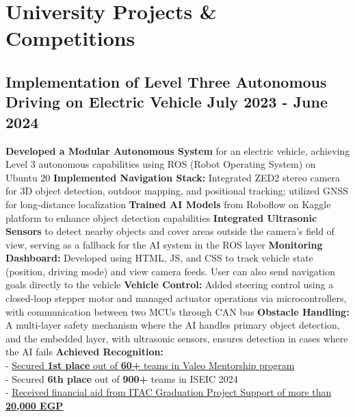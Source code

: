 \section*{University Projects \& Competitions}
%
%
%
\subsection*{
  Implementation of Level Three Autonomous Driving on Electric Vehicle
  \hspace*{\fill}
  \dateformat July 2023 - June 2024
}
\begin{tasks}
  \task \textbf{Developed a Modular Autonomous System} for an electric vehicle, achieving Level 3 autonomous capabilities using ROS (Robot Operating System) on Ubuntu 20
  \task \textbf{Implemented Navigation Stack:} Integrated ZED2 stereo camera for 3D object detection, outdoor mapping, and positional tracking; utilized GNSS for long-distance localization
  \task \textbf{Trained AI Models} from Roboflow on Kaggle platform to enhance object detection capabilities
  \task \textbf{Integrated Ultrasonic Sensors} to detect nearby objects and cover areas outside the camera's field of view, serving as a fallback for the AI system in the ROS layer
  \task \textbf{Monitoring Dashboard:} Developed using HTML, JS, and CSS to track vehicle state (position, driving mode) and view camera feeds. User can also send navigation goals directly to the vehicle
  \task \textbf{Vehicle Control:} Added steering control using a closed-loop stepper motor and managed actuator operations via microcontrollers, with communication between two MCUs through CAN bus
  \task \textbf{Obstacle Handling:} A multi-layer safety mechanism where the AI handles primary object detection, and the embedded layer, with ultrasonic sensors, ensures detection in cases where the AI fails
  \task \textbf{Achieved Recognition:}\\
    - \href{https://www.linkedin.com/feed/update/urn:li:activity:7230237292680933376/}{Secured \textbf{1st place} out of \textbf{60+} teams in Valeo Mentorship program}\\
    - Secured \textbf{6th place} out of \textbf{900+} teams in ISEIC 2024\\
    - \href{https://itida.gov.eg/English/Programs/Graduation/Documents/List-of-Accepted-Graduation-Projects-Round-19-new.pdf}{Received financial aid from ITAC Graduation Project Support of more than \textbf{20,000 EGP}}
\end{tasks}
%
%
%
